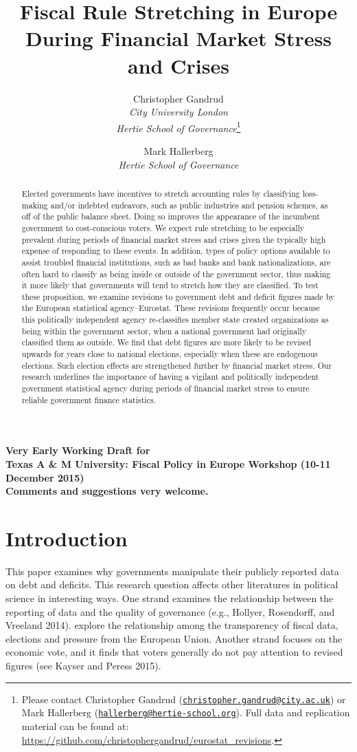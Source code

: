 \documentclass[]{article}
\title{Fiscal Rule Stretching in Europe During Financial Market Stress and Crises}
\author{Christopher Gandrud \\ \emph{City University London} \\ \emph{Hertie School of Governance}\footnote{Please contact Christopher Gandrud
(\href{mailto:christopher.gandrud@city.ac.uk}{\nolinkurl{christopher.gandrud@city.ac.uk}}) or Mark Hallerberg (\href{mailto:hallerberg@hertie-school.org}{\nolinkurl{hallerberg@hertie-school.org}}). Full data and replication material can be found at: \url{https://github.com/christophergandrud/eurostat_revisions}.}
\and
Mark Hallerberg \\ \emph{Hertie School of Governance}}
\begin{document}
\maketitle

\begin{center}
    \textbf{Very Early Working Draft for\\ Texas A \& M University: Fiscal Policy in Europe Workshop (10-11 December 2015) \\
    Comments and suggestions very welcome.}
\end{center}

\begin{abstract}
    Elected governments have incentives to stretch accounting rules by classifying loss-making and/or indebted endeavors, such as public industries and pension schemes, as off of the public balance sheet. Doing so improves the appearance of the incumbent government to cost-conscious voters. We expect rule stretching to be especially prevalent during periods of financial market stress and crises given the typically high expense of responding to these events. In addition, types of policy options available to assist troubled financial institutions, such as bad banks and bank nationalizations, are often hard to classify as being inside or outside of the government sector, thus making it more likely that governments will tend to stretch how they are classified. To test these proposition, we examine revisions to government debt and deficit figures made by the European statistical agency--Eurostat. These revisions frequently occur because this politically independent agency re-classifies member state created organizations as being within the government sector, when a national government had originally classified them as outside. We find that debt figures are more likely to be revised upwards for years close to national elections, especially when these are endogenous elections. Such election effects are strengthened further by financial market stress. Our research underlines the importance of having a vigilant and politically independent government statistical agency during periods of financial market stress to ensure reliable government finance statistics.
\end{abstract}

\section{Introduction}

This paper examines why governments manipulate their publicly reported data on debt and deficits. This research question affects other literatures in political science in interesting ways. One strand examines the relationship between the reporting of data and the quality of governance (e.g., Hollyer, Rosendorff, and Vreeland 2014).  \cite{Alt2014} explore the relationship among the transparency of fiscal data, elections and pressure from the European Union. Another strand focuses on the economic vote, and it finds that voters generally do not pay attention to revised figures (see Kayser and Peress 2015).
\end{document}

